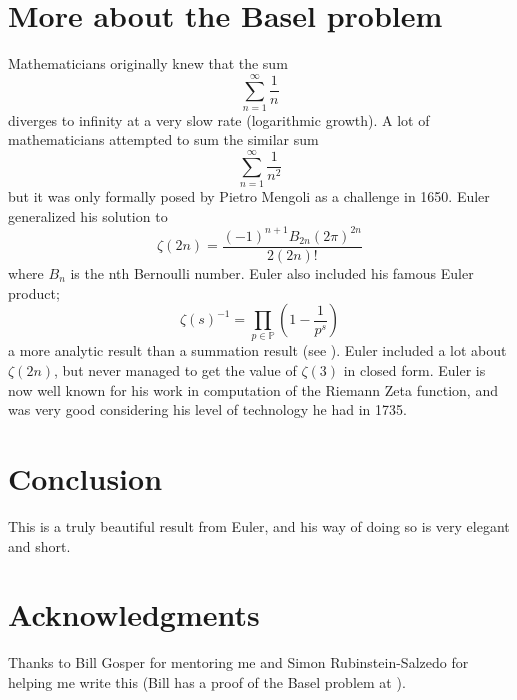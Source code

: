 \documentclass{article}
\theoremstyle{remark}
\theoremstyle{definition}
\begin{document}
\section{More about the Basel problem}
Mathematicians originally knew that the sum
    \[\sum_{n=1}^{\infty}\frac{1}{n}\]
diverges to infinity at a very slow rate (logarithmic growth). A lot of mathematicians attempted to sum the similar sum
    \[\sum_{n=1}^{\infty}\frac{1}{n^2}\]
but it was only formally posed by Pietro Mengoli as a challenge in 1650. Euler generalized his solution to
    \[\zeta (2n)={\frac {(-1)^{n+1}B_{2n}(2\pi )^{2n}}{2(2n)!}}\]
where $B_{n}$ is the nth Bernoulli number. Euler also included his famous Euler product;
    \[\zeta(s)^{-1}=\prod_{p\in\mathbb{P}}(1-\frac{1}{p^s})\]
a more analytic result than a summation result (see \cite{RS19}). Euler included a lot about $\zeta(2n)$, but never managed to get the value of $\zeta(3)$ in closed form. Euler is now well known for his work in computation of the Riemann Zeta function, and was very good considering his level of technology he had in 1735.
\section{Conclusion}
This is a truly beautiful result from Euler, and his way of doing so is very elegant and short.
\section{Acknowledgments}
Thanks to Bill Gosper for mentoring me and Simon Rubinstein-Salzedo for helping me write this (Bill has a proof of the Basel problem at \cite{Gos99}).


\end{document}
